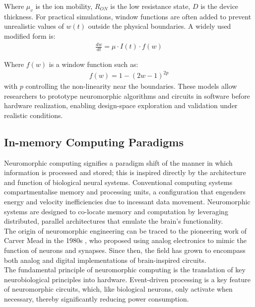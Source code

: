\noindent Where $\mu_v$ is the ion mobility, $R_{ON}$ is the low resistance state, $D$ is the device thickness. For practical simulations, window functions are often added to prevent unrealistic values of $w(t)$ outside the physical boundaries. A widely used modified form is:
\begin{align}
    \frac{dw}{dt} = \mu \cdot I(t) \cdot f(w) \label{eq:2.28}
\end{align}

\noindent Where $f(w)$ is a window function such as:
\begin{align}
    f(w) = 1 - (2w - 1)^{2p} \label{eq:2.29}
\end{align}
\noindent with $p$ controlling the non-linearity near the boundaries. These models allow researchers to prototype neuromorphic algorithms and circuits in software before hardware realization, enabling design-space exploration and validation under realistic conditions.


\subsection[In-memory Computing Paradigms]{In-memory Computing Paradigms}

\noindent Neuromorphic computing signifies a paradigm shift of the manner in which information is processed and stored; this is inspired directly by the architecture and function of biological neural systems. Conventional computing systems compartmentalise memory and processing units, a configuration that engenders energy and velocity inefficiencies due to incessant data movement. Neuromorphic systems are designed to co-locate memory and computation by leveraging distributed, parallel architectures that emulate the brain's functionality.\\

\noindent The origin of neuromorphic engineering can be traced to the pioneering work of Carver Mead in the 1980s \cite{mead1989analog}, who proposed using analog electronics to mimic the function of neurons and synapses. Since then, the field has grown to encompass both analog and digital implementations of brain-inspired circuits.\\

\noindent The fundamental principle of neuromorphic computing is the translation of key neurobiological principles into hardware. Event-driven processing is a key feature of neuromorphic circuits, which, like biological neurons, only activate when necessary, thereby significantly reducing power consumption. \\

